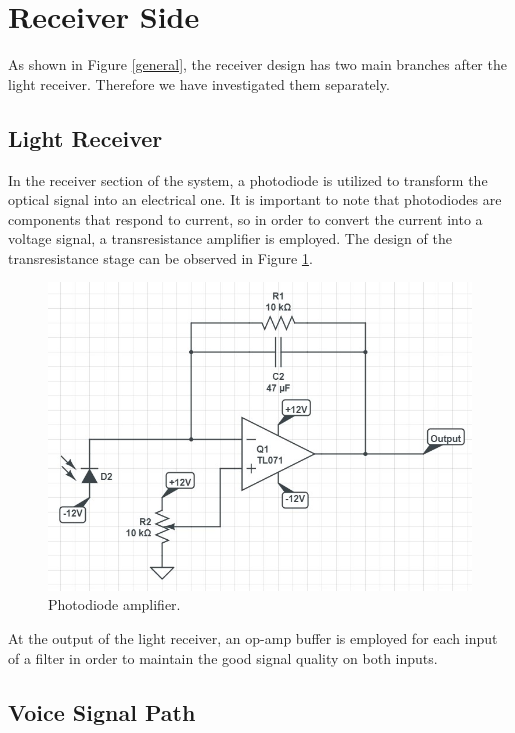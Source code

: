 \documentclass[a4paper,10pt]{IEEEtran}
\begin{document}
\section{Receiver Side}
As shown in Figure \ref{general}, the receiver design has two main branches after the light receiver. Therefore we have investigated them separately.
\subsection{Light Receiver}
In the receiver section of the system, a photodiode is utilized to transform the optical signal into an electrical one. It is important to note that photodiodes are components that respond to current, so in order to convert the current into a voltage signal, a transresistance amplifier is employed. The design of the transresistance stage can be observed in Figure \ref{photodiode}. 
\begin{figure}[htbp!]
    \centering
    \includegraphics[width = 1\linewidth]{Photodiode amplifier.jpg}
    \caption{Photodiode amplifier. }
    \label{photodiode}
\end{figure} 
At the output of the light receiver, an op-amp buffer is employed for each input of a filter in order to maintain the good signal quality on both inputs.
\subsection{Voice Signal Path}
\end{document}
